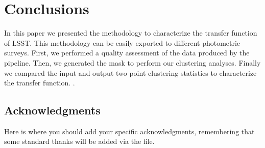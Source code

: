 \documentclass[\docopts]{\docclass}
\begin{document}

\section{Conclusions}
\label{sec:conclusions}

In this paper we presented the methodology to characterize the transfer function of LSST. This methodology can be easily exported to different photometric surveys. First, we performed a quality assessment of the data produced by the pipeline. Then, we generated the mask to perform our clustering analyses. Finally we compared the input and output two point clustering statistics to characterize the transfer function. .



\subsection*{Acknowledgments}

Here is where you should add your specific acknowledgments, remembering that some standard thanks will be added via the  file.





\end{document}
